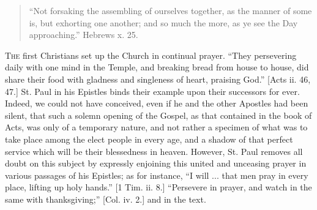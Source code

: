 
\begin{quote}

``Not forsaking the assembling of ourselves together, as the
manner of some is, but exhorting one another; and so much the more,
as ye see the Day approaching.'' Hebrews x. 25.

\end{quote}

T\textsc{he} first Christians set up the Church in continual prayer.
``They persevering daily with one mind in the Temple, and breaking
bread from house to house, did share their food with gladness and
singleness of heart, praising God.'' [Acts ii. 46, 47.] St. Paul
in his Epistles binds their example upon their successors for ever.
Indeed, we could not have conceived, even if he and the other Apostles
had been silent, that such a solemn opening of the Gospel, as that
contained in the book of Acts, was only of a temporary nature, and not
rather a specimen of what was to take place among the elect people in
every age, and a shadow of that perfect service which will be their
blessedness in heaven. However, St. Paul removes all doubt on this
subject by expressly enjoining this united and unceasing prayer in
various passages of his Epistles; as for instance, ``I will ...
that men pray in every place, lifting up holy hands.'' [1 Tim. ii.
8.] ``Persevere in prayer, and watch in the same with
thanksgiving;'' [Col. iv. 2.] and in the text.

